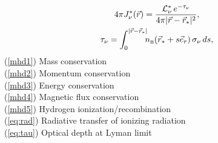 \begin{gather}
  4\pi J^*_\nu(\vec r) = 
  \frac{ \mathcal{L}^*_\nu \, e^{-\tau_\nu} }{ 4 \pi |\vec r - \vec r_*|^2 }, 
  \label{eq:rad}\\
  \tau_\nu = 
  \int_0^{|\vec r - \vec r_*|} \!\!\!  n_\mathrm{n} (\vec r_* + s \vec e_r) \, \sigma_\nu \, ds ,
  \label{eq:tau}
\end{gather}
(\ref{mhd1}) Mass conservation\\
(\ref{mhd2}) Momentum conservation\\
(\ref{mhd3}) Energy conservation\\
(\ref{mhd4}) Magnetic flux conservation\\
(\ref{mhd5}) Hydrogen ionization/recombination\\
(\ref{eq:rad}) Radiative transfer of ionizing radiation\\
(\ref{eq:tau}) Optical depth at Lyman limit\\

